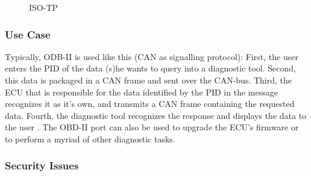 \begin{figure}[h]
	\centering
	\caption{ISO-TP}
	\label{fig:ISO-TP}
\end{figure} 

\subsubsection{Use Case}
Typically, ODB-II is used like this (CAN as signalling protocol): First, the user enters the PID of the data (s)he wants to query into a diagnostic tool. Second, this data is packaged in a CAN frame and sent over the CAN-bus. Third, the ECU that is responsible for the data identified by the PID in the message recognizes it as it's own, and transmits a CAN frame containing the requested data. Fourth, the diagnostic tool recognizes the response and displays the data to the user \cite{wiki:PID}. The OBD-II port can also be used to upgrade the ECU's firmware or to perform a myriad of other diagnostic tasks.





\subsubsection{Security Issues}
\label{subsec:obd:security_issues}

